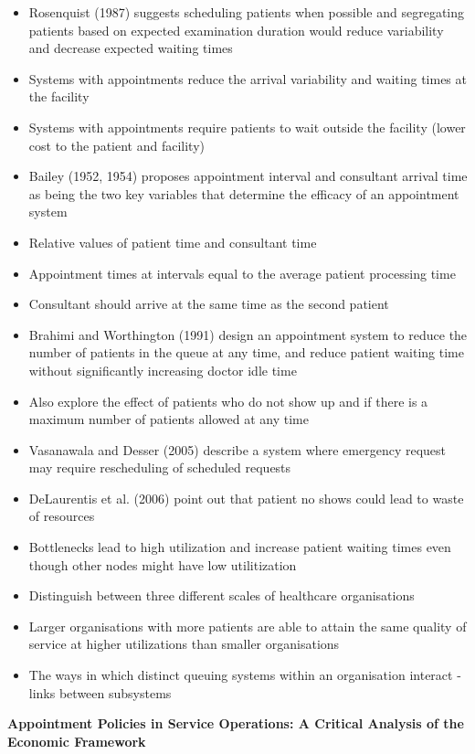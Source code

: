 \documentclass{article}
\begin{document}
\begin{itemize}
    \item Rosenquist (1987) suggests scheduling patients when possible and segregating patients based on expected examination duration would reduce variability and decrease expected waiting times
    \item Systems with appointments reduce the arrival variability and waiting times at the facility
    \item Systems with appointments require patients to wait outside the facility (lower cost to the patient and facility)
    \item Bailey (1952, 1954) proposes appointment interval and consultant arrival time as being the two key variables that determine the efficacy of an appointment system
    \item Relative values of patient time and consultant time
    \item Appointment times at intervals equal to the average patient processing time
    \item Consultant should arrive at the same time as the second patient
    \item Brahimi and Worthington (1991) design an appointment system to reduce the number of patients in the queue at any time, and reduce patient waiting time without significantly increasing doctor idle time
    \item Also explore the effect of patients who do not show up and if there is a maximum number of patients allowed at any time
    \item Vasanawala and Desser (2005) describe a system where emergency request may require rescheduling of scheduled requests
    \item DeLaurentis et al. (2006) point out that patient no shows could lead to waste of resources
    \item Bottlenecks lead to high utilization and increase patient waiting times even though other nodes might have low utilitization
    \item Distinguish between three different scales of healthcare organisations
    \item Larger organisations with more patients are able to attain the same quality of service at higher utilizations than smaller organisations
    \item The ways in which distinct queuing systems within an organisation interact - links between subsystems
\end{itemize}

\textbf{Appointment Policies in Service Operations: A Critical Analysis of the Economic Framework}
\end{document}
